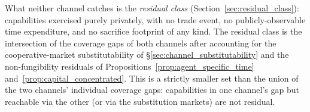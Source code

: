 What neither channel catches is the \emph{residual class}
(Section~\ref{sec:residual_class}): capabilities exercised purely
privately, with no trade event, no publicly-observable time
expenditure, and no sacrifice footprint of any kind.  The
residual class is the intersection of the coverage gaps of both
channels after accounting for the cooperative-market
substitutability of \S\ref{sec:channel_substitutability} and the
non-fungibility residuals of
Propositions~\ref{prop:agent_specific_time}
and~\ref{prop:capital_concentrated}.  This is a strictly smaller
set than the union of the two channels' individual coverage gaps:
capabilities in one channel's gap but reachable via the other
(or via the substitution markets) are not residual.
